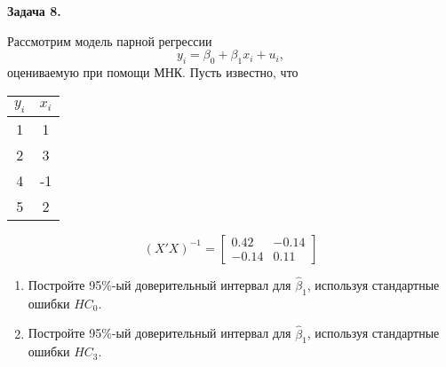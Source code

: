 \documentclass[10pt, a4paper]{extarticle}
\begin{document}
	{\Large \textbf{Задача 8.}}
	
	Рассмотрим модель парной регрессии
	\[
	y_i = \beta_0 + \beta_1x_i + u_i,
	\]
	оцениваемую при помощи МНК. Пусть известно, что 
	
	\begin{center}
	\begin{tabular}{c|c}
		$y_i$ & $x_i$ \\
		\hline
		1 & 1 \\
		2 & 3 \\
		4 & -1 \\
		5 & 2
	\end{tabular}
	\end{center}
	\[
	(X'X)^{-1} = \begin{bmatrix}
		0.42 & -0.14 \\
		-0.14 &  0.11
	\end{bmatrix}
	\]

	\begin{enumerate}[label = \alph*)]		
		\item Постройте 95\%-ый доверительный интервал для $\hat{\beta}_1$, используя стандартные ошибки $HC_0$.
		\item Постройте 95\%-ый доверительный интервал для $\hat{\beta}_1$, используя стандартные ошибки $HC_3$.
	\end{enumerate}
	
\end{document}

